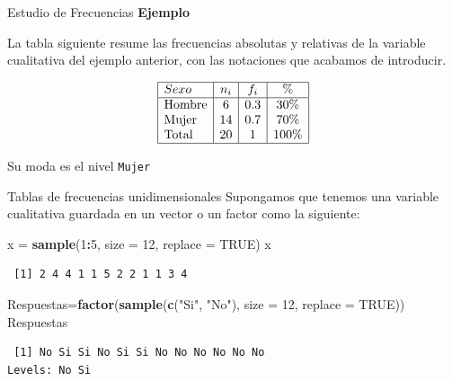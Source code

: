 \documentclass[
  ignorenonframetext,
  aspectratio=169]{beamer}
\newenvironment{Shaded}{\begin{snugshade}}{\end{snugshade}}
\newcommand{\AttributeTok}[1]{\textcolor[rgb]{0.13,0.29,0.53}{#1}}
\newcommand{\ConstantTok}[1]{\textcolor[rgb]{0.56,0.35,0.01}{#1}}
\newcommand{\DecValTok}[1]{\textcolor[rgb]{0.00,0.00,0.81}{#1}}
\newcommand{\FunctionTok}[1]{\textcolor[rgb]{0.13,0.29,0.53}{\textbf{#1}}}
\newcommand{\NormalTok}[1]{#1}
\newcommand{\OtherTok}[1]{\textcolor[rgb]{0.56,0.35,0.01}{#1}}
\newcommand{\SpecialCharTok}[1]{\textcolor[rgb]{0.81,0.36,0.00}{\textbf{#1}}}
\newcommand{\StringTok}[1]{\textcolor[rgb]{0.31,0.60,0.02}{#1}}
\begin{document}
\begin{frame}[fragile]{Estudio de Frecuencias}
\label{estudio-de-frecuencias-5}
\textbf{Ejemplo}

La tabla siguiente resume las frecuencias absolutas y relativas de la
variable cualitativa del ejemplo anterior, con las notaciones que
acabamos de introducir.

\[\begin{array}{|l|c|c|c|}
\hline
Sexo   & n_i & f_i & \%     \\ 
\hline
\text{Hombre} & 6    & 0.3  & 30\%   \\ 
\text{Mujer}  & 14   & 0.7  & 70\%   \\ 
\text{Total}  & 20   & 1    & 100\%  \\
\hline
\end{array}\]

Su moda es el nivel \texttt{Mujer}
\end{frame}

\begin{frame}[fragile]{Tablas de frecuencias unidimensionales}
\label{tablas-de-frecuencias-unidimensionales}
Supongamos que tenemos una variable cualitativa guardada en un vector o
un factor como la siguiente:

\begin{Shaded}
\begin{Highlighting}[]
\NormalTok{x }\OtherTok{=} \FunctionTok{sample}\NormalTok{(}\DecValTok{1}\SpecialCharTok{:}\DecValTok{5}\NormalTok{, }\AttributeTok{size =} \DecValTok{12}\NormalTok{, }\AttributeTok{replace =} \ConstantTok{TRUE}\NormalTok{)}
\NormalTok{x}
\end{Highlighting}
\end{Shaded}

\begin{verbatim}
 [1] 2 4 4 1 1 5 2 2 1 1 3 4
\end{verbatim}

\begin{Shaded}
\begin{Highlighting}[]
\NormalTok{Respuestas}\OtherTok{=}\FunctionTok{factor}\NormalTok{(}\FunctionTok{sample}\NormalTok{(}\FunctionTok{c}\NormalTok{(}\StringTok{"Si"}\NormalTok{, }\StringTok{"No"}\NormalTok{), }\AttributeTok{size =} \DecValTok{12}\NormalTok{, }\AttributeTok{replace =} \ConstantTok{TRUE}\NormalTok{)) }
\NormalTok{Respuestas}
\end{Highlighting}
\end{Shaded}

\begin{verbatim}
 [1] No Si Si No Si Si No No No No No No
Levels: No Si
\end{verbatim}
\end{frame}
\end{document}
